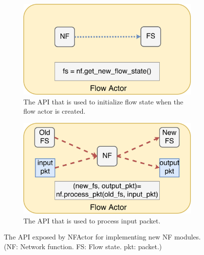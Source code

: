 \begin{figure}[!h]
\begin{subfigure}[t]{0.49\linewidth}
   \centering
   \includegraphics[width=\columnwidth]{figure/nf-module-api-init.pdf}
   \caption{The API that is used to initialize flow state when the flow actor is created.}\label{fig:init-api}
  \end{subfigure}\hfill
  \begin{subfigure}[t]{0.49\linewidth}
 \centering
   \includegraphics[width=\columnwidth]{figure/nf-module-api-process_pkt.pdf}
   \caption{The API that is used to process input packet.}\label{fig:pkt-process-api} \end{subfigure}\hfill
 \caption{The API exposed by NFActor for implementing new NF modules. (NF: Network function. FS: Flow state. pkt: packet.)}
\label{fig:api}
\end{figure}


